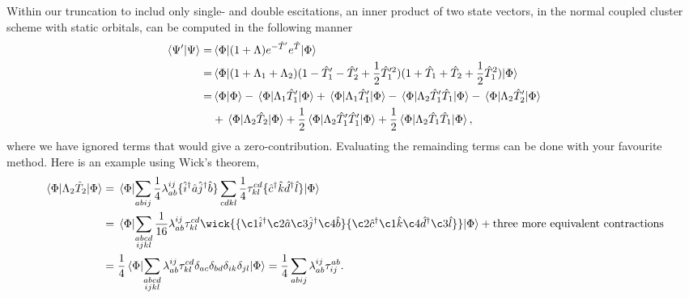     Within our truncation to includ only single- and double escitations,
    an inner product of two state vectors, in the normal coupled cluster scheme
    with static orbitals, can be computed in the following manner
    \begin{equation}
        \begin{aligned}
            \braket{\Psi'}{\Psi} 
            =& \mel{\Phi}
            {
                (1 + \Lambda)e^{-\hat{T}'} e^{\hat{T}}
            }
            {\Phi} \\
            =&
            \mel{\Phi}{
            (1 + \Lambda_1 + \Lambda_2)
            (1 - \hat{T}'_1 - \hat{T}'_2 + \frac{1}{2}\hat{T}'^2_1) 
            (1 + \hat{T}_1 + \hat{T}_2 + \frac{1}{2}\hat{T}^2_1)
            }{\Phi} \\
            =& \braket{\Phi} - \mel{\Phi}{\Lambda_1\hat{T}'_1}{\Phi} 
                + \mel{\Phi}{\Lambda_1\hat{T}'_1}{\Phi}
                - \mel{\Phi}{\Lambda_2\hat{T}'_1\hat{T}_1}{\Phi}
                - \mel{\Phi}{\Lambda_2\hat{T}'_2}{\Phi} \\
            \ & + \mel{\Phi}{\Lambda_2\hat{T}_2}{\Phi}
                + \frac{1}{2}\mel{\Phi}{\Lambda_2\hat{T}'_1\hat{T}'_1}{\Phi}
                + \frac{1}{2}\mel{\Phi}{\Lambda_2\hat{T}_1\hat{T}_1}{\Phi},
        \end{aligned}
    \end{equation}
    where we have ignored terms that would give a zero-contribution.
    Evaluating the remainding terms can be done with your 
    favourite method. Here is an example using Wick's theorem,
    \begin{equation}
        \begin{aligned}
            \mel{\Phi}{\Lambda_2\hat{T}_2}{\Phi} 
            &= \mel{\Phi} 
            {
            \sum_{abij} \frac{1}{4}\lambda^{ij}_{ab}
                \{\hat{i}^\dagger \hat{a} \hat{j}^\dagger \hat{b} \}
            \sum_{cdkl} \frac{1}{4}\tau^{cd}_{kl}
                \{\hat{c}^\dagger \hat{k} \hat{d}^\dagger \hat{l} \}           
            } 
            {\Phi} \\
            &= \mel{\Phi} 
            {
            \sum_{\substack{abcd\\ijkl}} \frac{1}{16}\lambda^{ij}_{ab} \tau^{cd}_{kl}
                \wick{
                \{\c1{\hat{i}^\dagger} \c2{\hat{a}} \c3{\hat{j}^\dagger} \c4{\hat{b}} \}
                \{\c2{\hat{c}^\dagger} \c1{\hat{k}} \c4{\hat{d}^\dagger} \c3{\hat{l}} \}
                } 
            } 
            {\Phi}  + \text{three more equivalent contractions} \\
            &= 
            \frac{1}{4} \mel{\Phi} 
            {
                \sum_{\substack{abcd \\ ijkl}} \lambda^{ij}_{ab} \tau^{cd}_{kl} 
                \delta_{ac} 
                \delta_{bd}
                \delta_{ik} 
                \delta_{jl}
            } {\Phi}
            = \frac{1}{4} \sum_{abij} \lambda^{ij}_{ab} \tau^{ab}_{ij}.
        \end{aligned}
    \end{equation}

